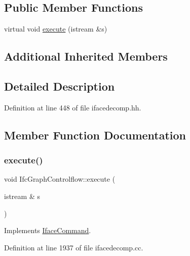 \subsection*{Public Member Functions}
\begin{DoxyCompactItemize}
\item 
virtual void \mbox{\hyperlink{class_ifc_graph_controlflow_aba87e4fc25a1fda8d53591f3781ec32e}{execute}} (istream \&s)
\end{DoxyCompactItemize}
\subsection*{Additional Inherited Members}


\subsection{Detailed Description}


Definition at line 448 of file ifacedecomp.\+hh.



\subsection{Member Function Documentation}
\mbox{\label{class_ifc_graph_controlflow_aba87e4fc25a1fda8d53591f3781ec32e}} 
\subsubsection{\texorpdfstring{execute()}{execute()}}
{\footnotesize\ttfamily void Ifc\+Graph\+Controlflow\+::execute (\begin{DoxyParamCaption}\item[{istream \&}]{s }\end{DoxyParamCaption})\hspace{0.3cm}{\ttfamily [virtual]}}



Implements \mbox{\hyperlink{class_iface_command_af10e29cee2c8e419de6efe9e680ad201}{Iface\+Command}}.



Definition at line 1937 of file ifacedecomp.\+cc.

